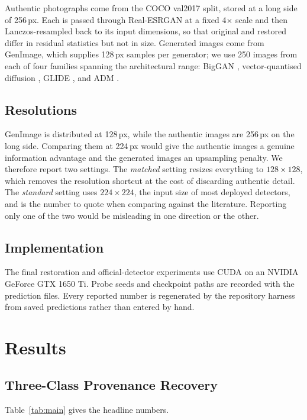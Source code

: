 ﻿\documentclass[graybox,norunningheads]{svmult}
\begin{document}
Authentic photographs come from the COCO val2017 split, stored at a long side of
256\,px. Each is passed through Real-ESRGAN at a fixed 4$\times$ scale and then
Lanczos-resampled back to its input dimensions, so that original and restored differ
in residual statistics but not in size. Generated images come from GenImage, which
supplies 128\,px samples per generator; we use 250 images from each of four families
spanning the architectural range: BigGAN \cite{brock2019biggan}, vector-quantised
diffusion \cite{gu2022vqdiffusion}, GLIDE \cite{nichol2022glide}, and ADM
\cite{dhariwal2021adm}.

\subsection{Resolutions}

GenImage is distributed at 128\,px, while the authentic images are 256\,px on the
long side. Comparing them at 224\,px would give the authentic images a genuine
information advantage and the generated images an upsampling penalty. We therefore
report two settings. The \emph{matched} setting resizes everything to
$128\times128$, which removes the resolution shortcut at the cost of discarding
authentic detail. The \emph{standard} setting uses $224\times224$, the input size of
most deployed detectors, and is the number to quote when comparing against the
literature. Reporting only one of the two would be misleading in one direction or
the other.

\subsection{Implementation}

The final restoration and official-detector experiments use CUDA on an NVIDIA
GeForce GTX 1650 Ti. Probe seeds and checkpoint paths are recorded with the
prediction files. Every reported number is regenerated by the repository
harness from saved predictions rather than entered by hand.

\section{Results}

\subsection{Three-Class Provenance Recovery}

Table~\ref{tab:main} gives the headline numbers.
\end{document}
